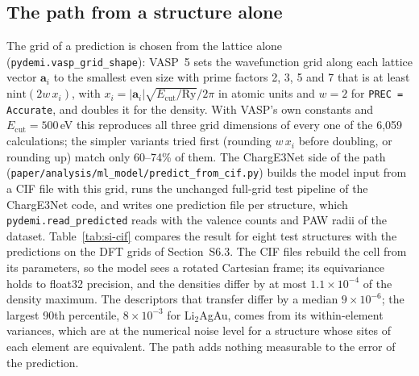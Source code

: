 \documentclass[11pt,a4paper]{article}
\begin{document}
\subsection{The path from a structure alone}
The grid of a prediction is chosen from the lattice alone
(\texttt{pydemi.vasp\_grid\_shape}): VASP~5 sets the wavefunction grid along
each lattice vector $\mathbf a_i$ to the smallest even size with prime factors
2, 3, 5 and 7 that is at least $\mathrm{nint}(2w\,x_i)$, with
$x_i=|\mathbf a_i|\sqrt{E_{\mathrm{cut}}/\mathrm{Ry}}/2\pi$ in atomic units and
$w=2$ for \texttt{PREC = Accurate}, and doubles it for the density. With
VASP's own constants and $E_{\mathrm{cut}}=500$\,eV this reproduces all three
grid dimensions of every one of the 6,059 calculations; the simpler variants
tried first (rounding $w\,x_i$ before doubling, or rounding up) match only
60--74\% of them. The ChargE3Net side of the path
(\texttt{paper/analysis/ml\_model/predict\_from\_cif.py}) builds the model
input from a CIF file with this grid, runs the unchanged full-grid test
pipeline of the ChargE3Net code, and writes one prediction file per
structure, which \texttt{pydemi.read\_predicted} reads with the valence
counts and PAW radii of the dataset. Table~\ref{tab:si-cif} compares the
result for eight test structures with the predictions on the DFT grids of
Section~S6.3. The CIF files rebuild the cell from its parameters, so the
model sees a rotated Cartesian frame; its equivariance holds to float32
precision, and the densities differ by at most $1.1\times10^{-4}$ of the
density maximum. The descriptors that transfer differ by a median
$9\times10^{-6}$; the largest 90th percentile, $8\times10^{-3}$ for
Li$_2$AgAu, comes from its within-element variances, which are at the
numerical noise level for a structure whose sites of each element are
equivalent. The path adds nothing measurable to the error of the prediction.





\end{document}
